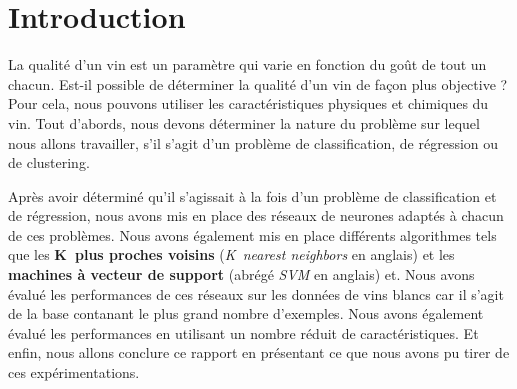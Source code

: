 \chapter{Introduction}
\label{chap:intro}

La qualité d'un vin est un paramètre qui varie en fonction du goût de tout un chacun. Est-il possible de déterminer la qualité
d'un vin de façon plus objective ? Pour cela, nous pouvons utiliser les caractéristiques physiques et chimiques du vin.
Tout d'abords, nous devons déterminer la nature du problème sur lequel nous allons travailler, s'il s'agit d'un problème de
classification, de régression ou de clustering.

Après avoir déterminé qu'il s'agissait à la fois d'un problème de classification et de régression, nous avons mis en place des
réseaux de neurones adaptés à chacun de ces problèmes. Nous avons également mis en place différents algorithmes tels que les
\textbf{K~plus proches voisins} (\textit{K~nearest neighbors} en anglais) et les \textbf{machines à vecteur de support} (abrégé
\textit{SVM} en anglais) et. Nous avons évalué les performances de ces réseaux sur les données de vins blancs car il s'agit de
la base contanant le plus grand nombre d'exemples. Nous avons également évalué les performances en utilisant un nombre réduit
de caractéristiques. Et enfin, nous allons conclure ce rapport en présentant ce que nous avons pu tirer de ces expérimentations.